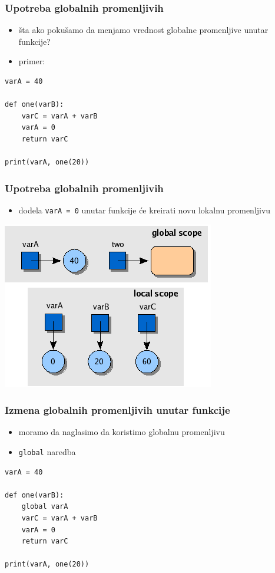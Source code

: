 \documentclass[compress]{beamer}
\begin{document}
\begin{frame}[fragile]
\frametitle{Upotreba globalnih promenljivih}
\begin{itemize}
  \item šta ako pokušamo da menjamo vrednost globalne promenljive unutar funkcije?
  \item primer:
\end{itemize}
\begin{verbatim}
varA = 40

def one(varB):
    varC = varA + varB
    varA = 0
    return varC

print(varA, one(20))
\end{verbatim}
\end{frame}

\begin{frame}[fragile]
\frametitle{Upotreba globalnih promenljivih}
\begin{itemize}
  \item dodela \texttt{varA = 0} unutar funkcije će kreirati novu lokalnu promenljivu
\end{itemize}
\begin{center}
  \includegraphics[scale=0.7]{globalvar.png}
\end{center}
\end{frame}

\begin{frame}[fragile]
\frametitle{Izmena globalnih promenljivih unutar funkcije}
\begin{itemize}
  \item moramo da naglasimo da koristimo globalnu promenljivu
  \item \texttt{global} naredba
\end{itemize}
\begin{verbatim}
varA = 40

def one(varB):
    global varA
    varC = varA + varB
    varA = 0
    return varC

print(varA, one(20))
\end{verbatim}
\end{frame}
\end{document}

